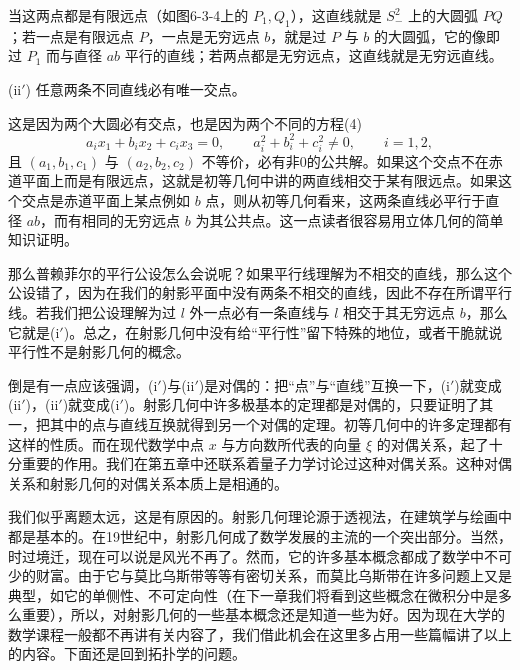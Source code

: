 当这两点都是有限远点（如图6-3-4上的 $P_1,Q_1$），这直线就是 $S_-^2$ 上的大圆弧 $PQ$；若一点是有限远点 $P$，一点是无穷远点 $b$，就是过 $P$ 与 $b$ 的大圆弧，它的像即过 $P_1$ 而与直径 $ab$ 平行的直线；若两点都是无穷远点，这直线就是无穷远直线。

\noindent(ii$'$) 任意两条不同直线必有唯一交点。

这是因为两个大圆必有交点，也是因为两个不同的方程(4)
\[
 a_i x_1+b_i x_2+c_i x_3=0,\qquad
 a_i^2+b_i^2+c_i^2\ne0,\qquad i=1,2,
\]
且 $(a_1,b_1,c_1)$ 与 $(a_2,b_2,c_2)$ 不等价，必有非0的公共解。如果这个交点不在赤道平面上而是有限远点，这就是初等几何中讲的两直线相交于某有限远点。如果这个交点是赤道平面上某点例如 $b$ 点，则从初等几何看来，这两条直线必平行于直径 $ab$，而有相同的无穷远点 $b$ 为其公共点。这一点读者很容易用立体几何的简单知识证明。

那么普赖菲尔的平行公设怎么会说呢？如果平行线理解为不相交的直线，那么这个公设错了，因为在我们的射影平面中没有两条不相交的直线，因此不存在所谓平行线。若我们把公设理解为过 $l$ 外一点必有一条直线与 $l$ 相交于其无穷远点 $b$，那么它就是(i$'$)。总之，在射影几何中没有给“平行性”留下特殊的地位，或者干脆就说平行性不是射影几何的概念。

倒是有一点应该强调，(i$'$)与(ii$'$)是对偶的：把“点”与“直线”互换一下，(i$'$)就变成(ii$'$)，(ii$'$)就变成(i$'$)。射影几何中许多极基本的定理都是对偶的，只要证明了其一，把其中的点与直线互换就得到另一个对偶的定理。初等几何中的许多定理都有这样的性质。而在现代数学中点 $x$ 与方向数所代表的向量 $\xi$ 的对偶关系，起了十分重要的作用。我们在第五章中还联系着量子力学讨论过这种对偶关系。这种对偶关系和射影几何的对偶关系本质上是相通的。

我们似乎离题太远，这是有原因的。射影几何理论源于透视法，在建筑学与绘画中都是基本的。在19世纪中，射影几何成了数学发展的主流的一个突出部分。当然，时过境迁，现在可以说是风光不再了。然而，它的许多基本概念都成了数学中不可少的财富。由于它与莫比乌斯带等等有密切关系，而莫比乌斯带在许多问题上又是典型，如它的单侧性、不可定向性（在下一章我们将看到这些概念在微积分中是多么重要），所以，对射影几何的一些基本概念还是知道一些为好。因为现在大学的数学课程一般都不再讲有关内容了，我们借此机会在这里多占用一些篇幅讲了以上的内容。下面还是回到拓扑学的问题。

